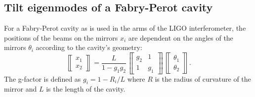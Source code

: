 \subsection{Tilt eigenmodes of a Fabry-Perot cavity}
For a Fabry-Perot cavity as is used in the arms of the LIGO
interferometer, the positions of the beams on the mirrors $x_i$ are
dependent on the angles of the mirrors $\theta_i$ according to the
cavity's geometry:
\begin{equation}
\left\llbracket \begin{array}{c}
x_1\\
x_2 \end{array} \right\rrbracket = \frac{L}{1-g_1 g_2}
\left\llbracket \begin{array}{cc}
g_2 & 1\\
1 & g_1\end{array} \right\rrbracket
\left\llbracket \begin{array}{c}
\theta_1\\
\theta_2 \end{array} \right\rrbracket .
\label{eq:x}
\end{equation}
The g-factor is defined as $g_i=1-R_i/L$ where $R$ is the radius of
curvature of the mirror and $L$ is the length of the cavity. 

